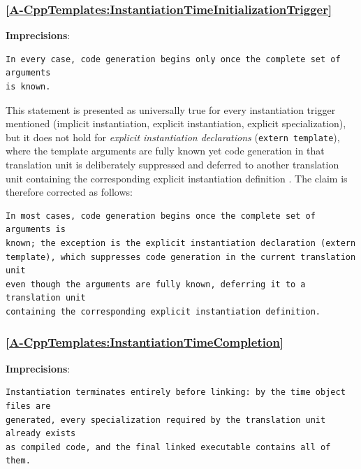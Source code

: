 \documentclass[11pt]{report}
\begin{document}
\subsubsection*{\hyperref[A-CppTemplates:InstantiationTimeInitializationTrigger]{\ref*{A-CppTemplates:InstantiationTimeInitializationTrigger} }}
\noindent\textbf{Imprecisions}:

\begin{Verbatim}[breaklines=true]
In every case, code generation begins only once the complete set of arguments
is known.
\end{Verbatim}

This statement is presented as universally true for every instantiation trigger
mentioned (implicit instantiation, explicit instantiation, explicit specialization),
but it does not hold for \emph{explicit instantiation declarations} (\texttt{extern
template}), where the template arguments are fully known yet code generation in
that translation unit is deliberately suppressed and deferred to another
translation unit containing the corresponding explicit instantiation definition
\cite{cpp_templates2017}. The claim is therefore corrected as follows:

\begin{Verbatim}[breaklines=true]
In most cases, code generation begins once the complete set of arguments is
known; the exception is the explicit instantiation declaration (extern
template), which suppresses code generation in the current translation unit
even though the arguments are fully known, deferring it to a translation unit
containing the corresponding explicit instantiation definition.
\end{Verbatim}

\subsubsection*{\hyperref[A-CppTemplates:InstantiationTimeCompletion]{\ref*{A-CppTemplates:InstantiationTimeCompletion} }}
\noindent\textbf{Imprecisions}:
\begin{Verbatim}[breaklines=true]
Instantiation terminates entirely before linking: by the time object files are
generated, every specialization required by the translation unit already exists
as compiled code, and the final linked executable contains all of them.
\end{Verbatim}
\end{document}
